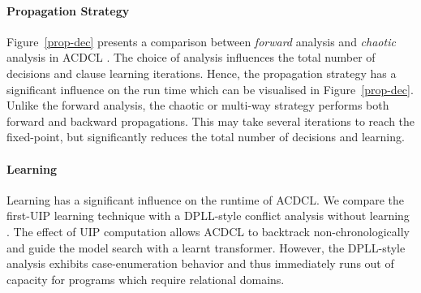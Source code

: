 \paragraph {\textbf{Propagation Strategy}}      
Figure~\ref{prop-dec} presents a comparison between {\em forward} analysis  and
{\em chaotic} analysis in ACDCL .  The choice of analysis influences the 
total number of decisions and clause learning iterations.  Hence, the 
propagation strategy has a significant influence on the run time which 
can be visualised in Figure~\ref{prop-dec}.  Unlike the forward analysis, 
the chaotic or multi-way strategy performs both forward and backward 
propagations.  This may take several iterations to reach the fixed-point, but 
significantly reduces the total number of decisions and learning.  

\paragraph {\textbf{Learning}} Learning has a significant influence on
the runtime of ACDCL.  We compare the first-UIP learning technique with 
a DPLL-style conflict analysis without learning .  The effect of UIP computation 
allows ACDCL to backtrack non-chronologically and guide the model search with 
a learnt transformer.  However, the DPLL-style analysis exhibits
case-enumeration behavior and thus immediately runs out of capacity for programs 
which require relational domains.         


